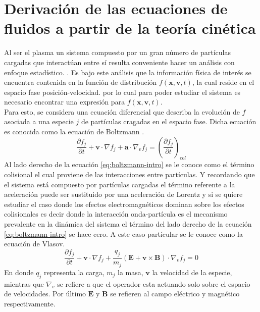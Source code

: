 \documentclass[../tesis_main_file.tex]{subfiles}
\begin{document}
\section{Derivación de las ecuaciones de fluidos a partir de la teoría cinética}
Al ser el plasma un sistema compuesto por un gran número de partículas cargadas que interactúan entre sí resulta conveniente hacer un análisis con enfoque estadístico.  \cite{bittencourt2013fundamentals}.
Es bajo este análisis que la información física de interés se encuentra contenida en la función de distribución $f(\textbf{x},\textbf{v},t)$, la cual reside en el espacio fase posición-velocidad. por lo cual para poder estudiar el sistema es necesario encontrar una expresión para $f(\textbf{x},\textbf{v},t)$.\\
Para esto, se considera una ecuación diferencial que describa la evolución de $f$ asociada a una especie $j$ de partículas cragadas en el espacio fase.
 Dicha ecuación es conocida como la ecuación de Boltzmann \cite{jardin2010computational} .
\begin{equation}
\label{eq:boltzmann-intro}
\frac{\partial f_j}{\partial t}+ \textbf{v}\cdot \nabla f_j + \textbf{a}\cdot \nabla _v f_j=\left(\frac{\partial f_j}{\partial t}\right)_{col}
\end{equation}
Al lado derecho  de la ecuación \ref{eq:boltzmann-intro} se le conoce como el término colisional el cual proviene de las interacciones entre partículas.
Y recordando que el sistema está compuesto por partículas cargadas el término referente a la aceleración puede ser sustituido por una aceleración de Lorentz y si se quiere estudiar el caso donde los efectos electromagnéticos dominan sobre los efectos colisionales es decir donde la interacción onda-partícula es el mecanismo prevalente en la dinámica del sistema el término del lado derecho de la ecuación \ref{eq:boltzmann-intro} se hace cero.
 A este caso partícular se le conoce como la ecuación de Vlasov.
\begin{equation}
\label{eq:boltzmann-vlasov-intro}
\frac{\partial f_j}{\partial t}+ \textbf{v}\cdot \nabla f_j + \frac{q_j}{m_j}\left( \textbf{E} + \textbf{v} \times \textbf{B}\right)\cdot \nabla _v f_j=0
\end{equation}
En donde $q_j$ representa la carga, $m_j$ la masa, $\textbf{v}$ la velocidad de la especie, mientras que $\nabla _v$ se refiere a que el operador esta actuando solo sobre el espacio de velocidades. Por último $\textbf{E}$ y $\textbf{B}$ se refieren al campo eléctrico y magnético respectivamente.\\
\end{document}
